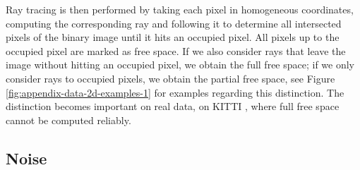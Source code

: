 Ray tracing is then performed by taking each pixel in homogeneous coordinates,
computing the corresponding ray and following it to determine all intersected
pixels of the binary image until it hits an occupied pixel. All pixels up to the
occupied pixel are marked as free space. If we also consider rays that leave
the image without hitting an occupied pixel, we obtain the full free space;
if we only consider rays to occupied pixels, we obtain the partial free space,
see Figure \ref{fig:appendix-data-2d-examples-1} for examples regarding this distinction.
The distinction becomes important on real data, \eg on KITTI
\cite{GeigerLenzUrtasun:2012,GeigerLenzStillerUrtasun:2013},
where full free space cannot be computed reliably.

\subsection{Noise}

